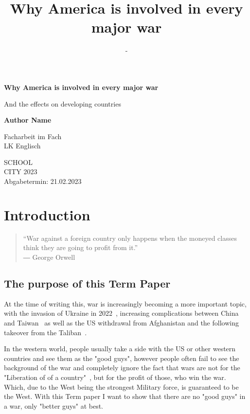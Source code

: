 \documentclass[12pt,a4paper]{article}
\title{Why America is involved in every major war}
\author{-}
\begin{document}
	\begin{center}
		{
		\vspace*{1cm}
		
		\Huge
		\textbf{Why America is involved in every major war}
		
		\vspace{0.5cm}
		\LARGE
		And the effects on developing countries
		
		\vspace{1.5cm}
		
		\textbf{Author Name}
		
		\vspace{1.5cm}
		
		Facharbeit im Fach\\
		LK Englisch
		
		\vfill
		\Large
		SCHOOL\\
		CITY 2023\\
		Abgabetermin: 21.02.2023
		}
	\end{center}
	\clearpage
	\newpage
	\tableofcontents
	\newpage
	\section{Introduction}
		\begin{quote}
		“War against a foreign country only happens when the moneyed classes think they are going to profit from it.”\\
		― George Orwell~\cite{orwell-quote}
		\end{quote}
		\subsection{The purpose of this Term Paper}
		At the time of writing this, war is increasingly becoming a more important topic, with the invasion of Ukraine in 2022~\cite{bbc-invasion-ukraine}, increasing complications between China and Taiwan~\cite{bbc-china-taiwan} as well as the US withdrawal from Afghanistan and the following takeover from the Taliban~\cite{cfr-afghanistan}.
		
		In the western world, people usually take a side with the US or other western countries and see them as the "good guys", however people often fail to see the background of the war and completely ignore the fact that  wars are not for the "Liberation of of a country"~\cite{george-bush-liberation-iraq}, but for the profit of those, who win the war. Which, due to the West being the strongest Military force, is guaranteed to be the West.
		With this Term paper I want to show that there are no "good guys" in a war, only "better guys" at best.
		
\end{document}
